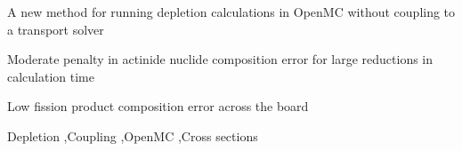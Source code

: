 \documentclass[a4paper,fleqn]{cas-dc}
\begin{document}

\begin{highlights}
\item A new method for running depletion calculations in OpenMC without coupling to a transport solver
\item Moderate penalty in actinide nuclide composition error for large reductions in calculation time
\item Low fission product composition error across the board
\end{highlights}

\begin{keywords}
 Depletion \sep Coupling \sep OpenMC \sep Cross sections
\end{keywords}


\maketitle









\end{document}
